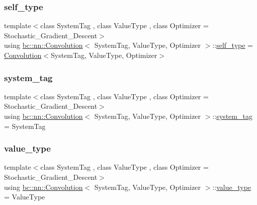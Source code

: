 \mbox{\label{structbc_1_1nn_1_1Convolution_a53ebb74b7fab047c1ad45a1f03fc8dd9}} 
\subsubsection{\texorpdfstring{self\+\_\+type}{self\_type}}
{\footnotesize\ttfamily template$<$class System\+Tag , class Value\+Type , class Optimizer  = Stochastic\+\_\+\+Gradient\+\_\+\+Descent$>$ \\
using \hyperlink{structbc_1_1nn_1_1Convolution}{bc\+::nn\+::\+Convolution}$<$ System\+Tag, Value\+Type, Optimizer $>$\+::\hyperlink{structbc_1_1nn_1_1Convolution_a53ebb74b7fab047c1ad45a1f03fc8dd9}{self\+\_\+type} =  \hyperlink{structbc_1_1nn_1_1Convolution}{Convolution}$<$System\+Tag, Value\+Type, Optimizer$>$}

\mbox{\label{structbc_1_1nn_1_1Convolution_aa4228d722aee390c2288f87ff676ee63}} 
\subsubsection{\texorpdfstring{system\+\_\+tag}{system\_tag}}
{\footnotesize\ttfamily template$<$class System\+Tag , class Value\+Type , class Optimizer  = Stochastic\+\_\+\+Gradient\+\_\+\+Descent$>$ \\
using \hyperlink{structbc_1_1nn_1_1Convolution}{bc\+::nn\+::\+Convolution}$<$ System\+Tag, Value\+Type, Optimizer $>$\+::\hyperlink{structbc_1_1nn_1_1Convolution_aa4228d722aee390c2288f87ff676ee63}{system\+\_\+tag} =  System\+Tag}

\mbox{\label{structbc_1_1nn_1_1Convolution_ad57a7bb1413ba889d475bfafac3c8461}} 
\subsubsection{\texorpdfstring{value\+\_\+type}{value\_type}}
{\footnotesize\ttfamily template$<$class System\+Tag , class Value\+Type , class Optimizer  = Stochastic\+\_\+\+Gradient\+\_\+\+Descent$>$ \\
using \hyperlink{structbc_1_1nn_1_1Convolution}{bc\+::nn\+::\+Convolution}$<$ System\+Tag, Value\+Type, Optimizer $>$\+::\hyperlink{structbc_1_1nn_1_1Convolution_ad57a7bb1413ba889d475bfafac3c8461}{value\+\_\+type} =  Value\+Type}



